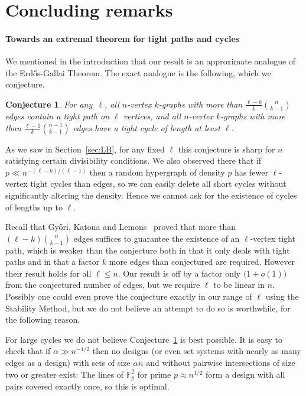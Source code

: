 \documentclass[12pt,a4paper]{amsart}
\newtheorem{conjecture}[theorem] {Conjecture}
\begin{document}
\section{Concluding remarks}
\label{sec:conclude}

\paragraph{\bf Towards an extremal theorem for tight paths and cycles}

We mentioned in the introduction that our result is an approximate analogue
of the Erd\H{o}s-Gallai Theorem. The exact analogue is the following, which we
conjecture.

\begin{conjecture}\label{conj:EG} For any~$\ell$, all $n$-vertex
  $k$-graphs with more than $\tfrac{\ell-k}{k}\binom{n}{k-1}$ edges
  contain a
  tight path on $\ell$ vertices, and all $n$-vertex
  $k$-graphs with more than $\tfrac{\ell-1}{k}\binom{n-1}{k-1}$ edges have
  a tight cycle of length at least $\ell$. 
\end{conjecture}

As we saw in Section~\ref{sec:LB}, for any fixed $\ell$ this conjecture is
sharp for $n$ satisfying certain divisibility conditions. We also observed
there that if $p\ll n^{-(\ell-k)/(\ell-1)}$
then a random hypergraph of density $p$ has fewer $\ell$-vertex tight
cycles than edges, so we can easily delete all short cycles without
significantly altering the density. Hence we cannot ask for the existence
of cycles of lengths up to $\ell$.

Recall that Gy\H{o}ri, Katona and Lemons~\cite{GyKatLem} proved that more
than $(\ell-k)\binom{n}{k-1}$ edges suffices to guarantee the existence of
an $\ell$-vertex tight path, which is weaker than the
conjecture both in that it only deals with tight paths and in that a factor $k$
more edges than conjectured are required. However their result holds for
all $\ell\le n$. Our result is off by a factor only
$\big(1+o(1)\big)$ from the conjectured number of edges, but we require $\ell$
to be linear in $n$. Possibly one could even prove the conjecture exactly in
our range of $\ell$ using the Stability Method, but we do not believe an
attempt to do so is worthwhile, for the following reason.

For large cycles we do not believe Conjecture~\ref{conj:EG} is best
possible. It is easy to check that if $\alpha\gg n^{-1/2}$ then no designs
(or even set systems with nearly as many edges as a design) with sets of
size $\alpha n$ and without pairwise intersections of size two or greater
exist: The lines of $\mathbb{F}^2_p$ for prime $p\approx n^{1/2}$ form a
design with all pairs covered exactly once, so this is optimal.
\end{document}

